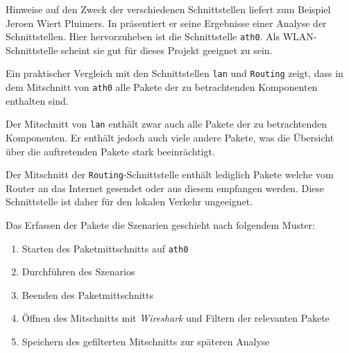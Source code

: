 Hinweise auf den Zweck der verschiedenen Schnittstellen liefert zum Beispiel Jeroen Wiert Pluimers.
In \cite{fritzcap8:online} präsentiert er seine Ergebnisse einer Analyse der Schnittstellen.
Hier hervorzuheben ist die Schnittstelle \texttt{ath0}.
Als WLAN-Schnittstelle scheint sie gut für dieses Projekt geeignet zu sein.

Ein praktischer Vergleich mit den Schnittstellen \texttt{lan} und \texttt{Routing} zeigt,
dass in dem Mitschnitt von \texttt{ath0} alle Pakete der zu betrachtenden Komponenten enthalten sind.

Der Mitschnitt von \texttt{lan} enthält zwar auch alle Pakete der zu betrachtenden Komponenten.
Er enthält jedoch auch viele andere Pakete, was die Übersicht über die auftretenden Pakete stark beeinrächtigt.

Der Mitschnitt der \texttt{Routing}-Schnittstelle enthält lediglich Pakete welche vom Router an das Internet gesendet
oder aus diesem empfangen werden.
Diese Schnittstelle ist daher für den lokalen Verkehr ungeeignet.

Das Erfassen der Pakete die Szenarien geschieht nach folgendem Muster:
\begin{enumerate}
    \setlength\itemsep{-0.5em}
    \item Starten des Paketmittschnitts auf \texttt{ath0}
    \item Durchführen des Szenarios
    \item Beenden des Paketmittschnitts
    \item Öffnen des Mitschnitts mit \textit{Wireshark} und Filtern der relevanten Pakete
    \item Speichern des gefilterten Mitschnitts zur späteren Analyse
\end{enumerate}